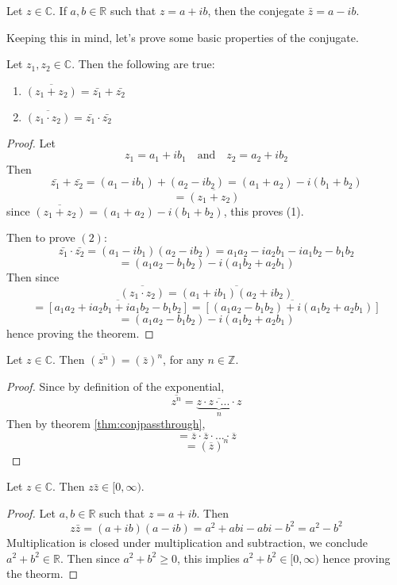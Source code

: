 \documentclass[11pt]{article}
\numberwithin{lemma}{section}
\numberwithin{equation}{section}
\numberwithin{define}{section}
\numberwithin{prop}{section}
\numberwithin{figure}{section}
\numberwithin{theorem}{section}
\numberwithin{cor}{section}
\newcounter{ex}[section]
\numberwithin{ex}{section}
\def\real{\mathbb{R}}
\def\complex{\mathbb{C}}
\def\integ{\mathbb{Z}}
\def\jand{\quad\text{and}\quad}
\begin{document}
\begin{define}
Let $z\in\complex$. If $a,b\in\real$ such that $z=a+ib$, then the conjegate $\bar{z}=a-ib$.	
\end{define}
Keeping this in mind, let's prove some basic properties of the conjugate. 
\begin{theorem}
\label{thm:conjpassthrough}
Let $z_1,z_2\in\complex$. Then the following are true:
\begin{enumerate}
	\item $\overline{(z_1+z_2)}=\bar{z_1}+\bar{z_2}$
	\item $\overline{(z_1\cdot z_2)}=\bar{z_1}\cdot \bar{z_2}$
\end{enumerate}	
\end{theorem}
\begin{proof}
	Let
	$$z_1=a_1+ib_1 \jand z_2=a_2+ib_2$$
	Then
	$$\bar{z_1}+\bar{z_2}=(a_1-ib_1)+(a_2-ib_2)=(a_1+a_2)-i(b_1+b_2)$$
	$$=\overline{(z_1+z_2)}$$
	since $\overline{(z_1+z_2)}=(a_1+a_2)-i(b_1+b_2)$, this proves (1).
	
	Then to prove $(2)$:
	$$\bar{z_1}\cdot \bar{z_2}=(a_1-ib_1)(a_2-ib_2)=a_1a_2-ia_2b_1-ia_1b_2-b_1b_2$$
	$$=(a_1a_2-b_1b_2)-i(a_1b_2+a_2b_1)$$
	Then since 
	$$\overline{(z_1\cdot z_2)}=\overline{(a_1+ib_1)(a_2+ib_2)}$$
	$$=\overline{[a_1a_2+ia_2b_1+ia_1b_2-b_1b_2]}=\overline{[(a_1a_2-b_1b_2)+i(a_1b_2+a_2b_1)]}$$
	$$=(a_1a_2-b_1b_2)-i(a_1b_2+a_2b_1)$$
	hence proving the theorem.
\end{proof}

\begin{cor}
	Let $z\in\complex$. Then $\overline{(z^n)}=(\bar{z})^n$, for any $n\in\integ$.\footnotemark
\end{cor}
\begin{proof}
	Since by definition of the exponential,
	$$\overline{z^n}=\underbrace{\overline{z\cdot z\cdot ... \cdot z}}_n$$
	Then by theorem \eqref{thm:conjpassthrough},
	$$=\overline{z}\cdot \overline{z} \cdot ... \cdot \overline{z}$$
	$$=(\overline{z})^n$$
\end{proof}

\begin{theorem}
\label{thm:modsq}
Let $z\in\complex$. Then $z\bar z\in[0,\infty)$.	
\end{theorem}
\begin{proof}
	Let $a,b\in\real$ such that $z=a+ib$. Then
	$$z\bar z=(a+ib)(a-ib)=a^2+abi-abi-b^2=a^2-b^2$$
	Multiplication is closed under multiplication and subtraction, we conclude $a^2+b^2\in\real$. Then since $a^2+b^2\ge 0$, this implies $a^2+b^2\in[0,\infty)$ hence proving the theorm.
\end{proof}
\end{document}
